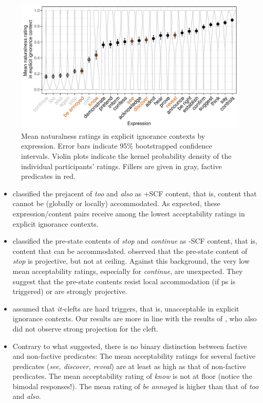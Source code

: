\documentclass[11pt,fleqn]{article}
\newcommand{\6}{\mbox{$[\hspace*{-.6mm}[$}}
\newcommand{\9}{\mbox{$]\hspace*{-.6mm}]$}}
\begin{document}
\begin{figure}[h!]
\centering
\includegraphics[width=\textwidth]{../../results/main/13explicitIgnorance/graphs/explicit-ignorance-naturalness-by-predicate}
\caption{Mean naturalness ratings in explicit ignorance contexts by expression. Error bars indicate 95\% bootstrapped confidence intervals. Violin plots indicate the kernel probability density of the individual participants' ratings. Fillers are given in gray, factive predicates in red.}\label{fig:acc-by-expression}
\end{figure}

\begin{itemize}

\item \citealt{brst-lang11} classified the prejacent of {\em too} and {\em also} as +SCF content, that is, content that cannot be (globally or locally) accommodated. As expected, these expression/content pairs receive among the lowest acceptability ratings in explicit ignorance contexts.

\item \citealt{brst-lang11} classified the pre-state contents of {\em stop} and {\em continue} as -SCF content, that is, content that can be accommodated. \citealt{tbd-variability} observed that the pre-state content of {\em stop} is projective, but not at ceiling. Against this background, the very low mean acceptability ratings, especially for {\em continue}, are unexpected. They suggest that the pre-state contents resist local accommodation (if ps is triggered) or are strongly projective.

\item \citealt{abusch10} assumed that {\em it-}clefts are hard triggers, that is, unacceptable in explicit ignorance contexts. Our results are more in line with the results of \citealt{smith-hall-cls}, who also did not observe strong projection for the cleft.

\item Contrary to what \citealt{mandelkern-etal2020} suggested, there is no binary distinction between factive and non-factive predicates: The mean acceptability ratings for several factive predicates ({\em see, discover, reveal}) are at least as high as that of non-factive predicates.  The mean acceptability rating of {\em know} is not at floor (notice the bimodal responses!). The mean rating of {\em be annoyed} is higher than that of {\em too} and {\em also}.

\end{itemize}
\end{document}
